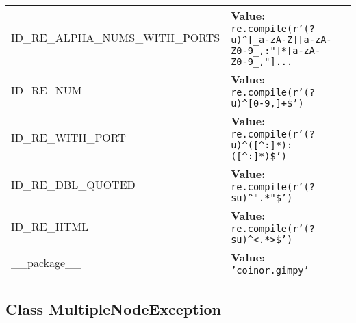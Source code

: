 \begin{longtable}{|p{\varnamewidth}|p{\vardescrwidth}|l}
\cline{1-2}
\raggedright I\-D\-\_\-R\-E\-\_\-A\-L\-P\-H\-A\-\_\-N\-U\-M\-S\-\_\-W\-I\-T\-H\-\_\-P\-O\-R\-T\-S\- & \raggedright \textbf{Value:} 
{\tt re.compile(r'\texttt{(?u)}{\textasciicircum}\texttt{[}\_a\texttt{-}zA\texttt{-}Z\texttt{]}\texttt{[}a\texttt{-}zA\texttt{-}Z0\texttt{-}9\_,:"\texttt{]}\texttt{*}\texttt{[}a\texttt{-}zA\texttt{-}Z0\texttt{-}9\_,"\texttt{]}\texttt{...}}&\\
\cline{1-2}
\raggedright I\-D\-\_\-R\-E\-\_\-N\-U\-M\- & \raggedright \textbf{Value:} 
{\tt re.compile(r'\texttt{(?u)}{\textasciicircum}\texttt{[}0\texttt{-}9,\texttt{]}\texttt{+}\$')}&\\
\cline{1-2}
\raggedright I\-D\-\_\-R\-E\-\_\-W\-I\-T\-H\-\_\-P\-O\-R\-T\- & \raggedright \textbf{Value:} 
{\tt re.compile(r'\texttt{(?u)}{\textasciicircum}\texttt{(}\texttt{[{\textasciicircum}}:\texttt{]}\texttt{*}\texttt{)}:\texttt{(}\texttt{[{\textasciicircum}}:\texttt{]}\texttt{*}\texttt{)}\$')}&\\
\cline{1-2}
\raggedright I\-D\-\_\-R\-E\-\_\-D\-B\-L\-\_\-Q\-U\-O\-T\-E\-D\- & \raggedright \textbf{Value:} 
{\tt re.compile(r'\texttt{(?su)}{\textasciicircum}".\texttt{*}"\$')}&\\
\cline{1-2}
\raggedright I\-D\-\_\-R\-E\-\_\-H\-T\-M\-L\- & \raggedright \textbf{Value:} 
{\tt re.compile(r'\texttt{(?su)}{\textasciicircum}{\textless}.\texttt{*}{\textgreater}\$')}&\\
\cline{1-2}
\raggedright \_\-\_\-p\-a\-c\-k\-a\-g\-e\-\_\-\_\- & \raggedright \textbf{Value:} 
{\tt \texttt{'}\texttt{coinor.gimpy}\texttt{'}}&\\
\cline{1-2}
\end{longtable}



\subsection{Class MultipleNodeException}

